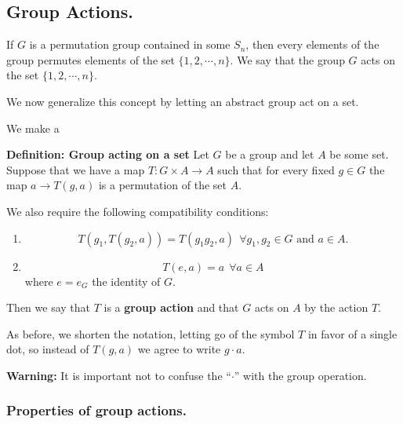 \documentclass[12pt]{article}
\newcommand{\deff}[1]{{\bf Definition: #1} }
\begin{document}
\subsection{Group Actions.}

If $G$ is a permutation group contained in some $S_n$, then every
elements of the group permutes elements of the set $\{1,2,\cdots,n\}$.
We say that the group $G$ acts on the set $\{1,2,\cdots,n\}$.

We now generalize this concept by letting an abstract group act on a
set.

We make a

\deff{Group acting on a set}
Let $G$ be a group and let $A$ be some set.
Suppose that we have a map $T: G\times A \rightarrow A$ such that
for every fixed $g\in G$ the map $a \rightarrow T(g,a)$ is a permutation
of the set $A$.

We also require the following compatibility
conditions:
\begin{enumerate}
\item
$$T(g_1,T(g_2,a))=T(g_1g_2,a)~~ \forall g_1,g_2\in G \mbox{ and } a
\in A.$$
\item $$T(e,a) = a ~~\forall a \in A$$ where $e=e_G$ the identity of
$G$.
\end{enumerate}

Then we say that $T$ is a {\bf group action }
and that $G$ acts on $A$ by the action $T$.

As before, we shorten the notation, letting go of the symbol $T$ in
favor of a single dot, so instead of $T(g,a)$ we agree to write $g\cdot
a$.

{\bf Warning:} It is important not to confuse the ``$\cdot$'' with the
group operation.

\subsubsection{Properties of group actions.}
\end{document}

